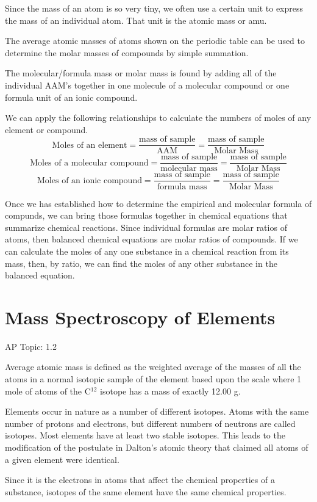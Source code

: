 \documentclass[../chem.tex]{subfiles}
\begin{document}
Since the mass of an atom is so very tiny, we often use a certain unit to express the mass of an individual atom. That unit is the atomic mass or amu. 

The average atomic masses of atoms shown on the periodic table can be used to determine the molar masses of compounds by simple summation.

The molecular/formula mass or molar mass is found by adding all of the individual AAM's together in one molecule of a molecular compound or one formula unit of an ionic compound.

We can apply the following relationships to calculate the numbers of moles of any element or compound.
\[\text{Moles of an element}=\frac{\text{mass of sample}}{\text{AAM}}=\frac{\text{mass of sample}}{\text{Molar Mass}}\]
\[\text{Moles of a molecular compound}=\frac{\text{mass of sample}}{\text{molecular mass}}=\frac{\text{mass of sample}}{\text{Molar Mass}}\]
\[\text{Moles of an ionic compound}=\frac{\text{mass of sample}}{\text{formula mass}}=\frac{\text{mass of sample}}{\text{Molar Mass}}\]

Once we has established how to determine the empirical and molecular formula of compunds, we can bring those formulas together in chemical equations 
that summarize chemical reactions. Since individual formulas are molar ratios of atoms, then balanced chemical equations are molar ratios of compounds.
If we can calculate the moles of any one substance in a chemical reaction from its mass, then, by ratio, we can find the moles of any other substance in the balanced equation.

\section{Mass Spectroscopy of Elements}
AP Topic: 1.2

Average atomic mass is defined as the weighted average of the masses of all the atoms in a normal isotopic sample of the element 
based upon the scale where 1 mole of atoms of the C$^{12}$ isotope has a mass of exactly 12.00 g.

Elements occur in nature as a number of different isotopes. Atoms with the same number of protons and electrons, but different numbers of neutrons are called isotopes.
Most elements have at least two stable isotopes. This leads to the modification of the postulate in Dalton's atomic theory that claimed all atoms of a given element were identical.

Since it is the electrons in atoms that affect the chemical properties of a substance, isotopes of the same element have the same chemical properties.
\end{document}
